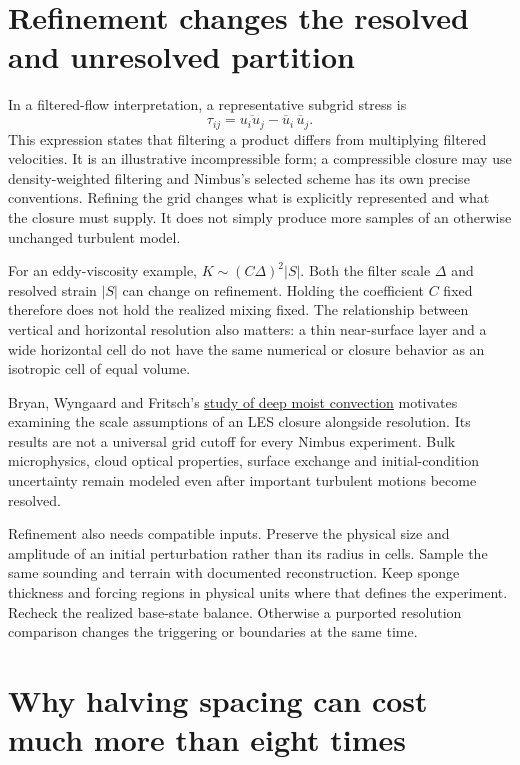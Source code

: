 \section{Refinement changes the resolved and unresolved partition}

In a filtered-flow interpretation, a representative subgrid stress is
\[
 \tau_{ij}=\overline{u_i u_j}-\overline{u}_i\,\overline{u}_j.
\]
This expression states that filtering a product differs from multiplying
filtered velocities. It is an illustrative incompressible form; a compressible
closure may use density-weighted filtering and Nimbus's selected scheme has
its own precise conventions. Refining the grid changes what is explicitly
represented and what the closure must supply. It does not simply produce more
samples of an otherwise unchanged turbulent model.

For an eddy-viscosity example, $K\sim(C\Delta)^2|S|$. Both the filter scale
$\Delta$ and resolved strain $|S|$ can change on refinement. Holding the
coefficient $C$ fixed therefore does not hold the realized mixing fixed.
The relationship between vertical and horizontal resolution also matters:
a thin near-surface layer and a wide horizontal cell do not have the same
numerical or closure behavior as an isotropic cell of equal volume.

Bryan, Wyngaard and Fritsch's
\href{https://journals.ametsoc.org/view/journals/mwre/131/10/1520-0493_2003_131_2394_rrftso_2.0.co_2.xml}{study
of deep moist convection} motivates examining the scale assumptions of an
LES closure alongside resolution. Its results are not a universal grid cutoff
for every Nimbus experiment. Bulk microphysics, cloud optical properties,
surface exchange and initial-condition uncertainty remain modeled even after
important turbulent motions become resolved.

Refinement also needs compatible inputs. Preserve the physical size and
amplitude of an initial perturbation rather than its radius in cells. Sample
the same sounding and terrain with documented reconstruction. Keep sponge
thickness and forcing regions in physical units where that defines the
experiment. Recheck the realized base-state balance. Otherwise a purported
resolution comparison changes the triggering or boundaries at the same time.

\section{Why halving spacing can cost much more than eight times}

